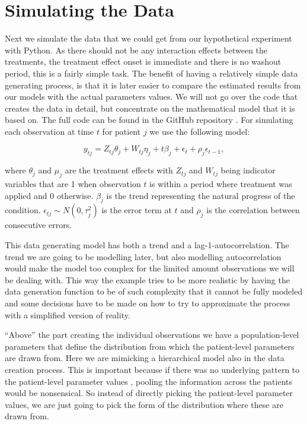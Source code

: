 \documentclass[12pt,a4paper,leqno]{report}
\theoremstyle{plain}
\theoremstyle{definition}
\theoremstyle{remark}
\begin{document}
\section{Simulating the Data}

Next we simulate the data that we could get from our hypothetical experiment with Python.
As there should not be any interaction effects between the treatments, the treatment
effect onset is immediate and there is no washout period, this is a fairly simple
task. The benefit of having a relatively simple data generating process, is that it is
later easier to compare the estimated results from our models with the actual parameters
values. We will not go over the code that creates the data in detail, but concentrate on
the mathematical model that it is based on. The full code can be found in the GitHub repository
\cite{github}. For simulating each observation at time \(t\) for patient \(j\) we use the following model:

\begin{def}\label{simulationmodel}
    \begin{equation}\label{}
        y_{tj} = Z_{tj}\theta_{j} + W_{tj}\eta_{j} + t\beta_j + \epsilon_t + \rho_j\epsilon_{t-1},
    \end{equation}
\end{def}where \(\theta_j\) and \(\mu_j\) are the treatment effects with \(Z_{tj}\) and \(W_{tj}\) being indicator
variables that are 1 when observation \(t\) is within a period where treatment was applied and
0 otherwise. \(\beta_j\) is the trend representing the natural progress of the
condition. \(\epsilon_{tj} \sim N(0,\tau_j^2) \) is the error term at \(t\) and
\(\rho_j\) is the correlation between consecutive errors.

This data generating model has both a trend and a lag-1-autocorrelation. The trend we
are going to be modelling later, but also modelling autocorrelation would make the model
too complex for the limited amount observations we will be dealing with. This way the example tries to be more realistic
by having the data generation function to be of such complexity that it cannot be
fully modeled and some decisions have to be made on how to try to approximate
the process with a simplified version of reality.

``Above'' the part creating the individual observations we have a population-level parameters
that define the distribution from which the patient-level parameters are drawn from.
Here we are mimicking a hierarchical model also in the data creation process. This is
important because if there was no underlying pattern to the patient-level parameter values
, pooling the information across the patients
would be nonsensical. So instead of directly picking the patient-level parameter values,
we are just going to pick the form of the distribution where these are drawn from.
\end{document}
